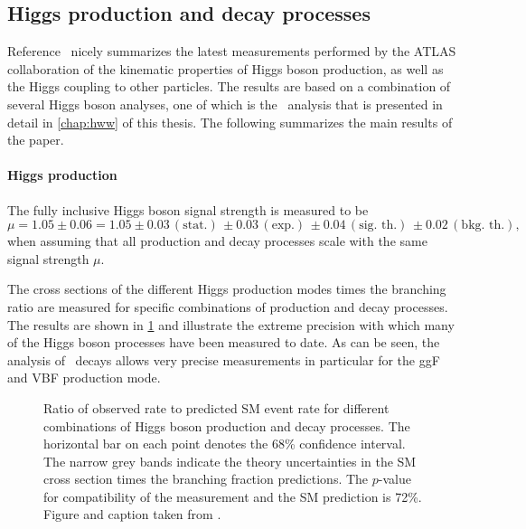 \subsection{Higgs production and decay processes}
Reference~\cite{NaturePaper} nicely summarizes the latest measurements performed by the ATLAS collaboration of the kinematic properties of Higgs boson production, as well as the Higgs coupling to other particles.
The results are based on a combination of several Higgs boson analyses, one of which is the \HWW\ analysis that is presented in detail in \cref{chap:hww} of this thesis. 
The following summarizes the main results of the paper.


\paragraph{Higgs production}
The fully inclusive Higgs boson signal strength is measured to be \cite{NaturePaper}
\begin{equation*}
   \mu =1.05 \pm 0.06 = 1.05\pm 0.03\, (\text{stat.})\, \pm 0.03\, (\text{exp.})\, \pm 0.04\, (\text{sig.\ th.})\, \pm 0.02\, (\text{bkg.\ th.}),
\end{equation*}
when assuming that all production and decay processes scale with the same signal strength $\mu$.

The cross sections of the different Higgs production modes times the branching ratio are measured for specific combinations of production and decay processes. The results are shown in \cref{fig:prod-per-channel} and illustrate the extreme precision with which many of the Higgs boson processes have been measured to date. As can be seen, the analysis of \HWW\ decays allows very precise measurements in particular for the ggF and VBF production mode.

\begin{figure}
  \caption{Ratio of observed rate to predicted SM event rate for different combinations of
  Higgs boson production and decay processes. The horizontal bar on each point denotes the 68\% confidence interval. The narrow grey bands indicate the theory uncertainties in the SM cross section times the branching
fraction predictions. The $p$-value for compatibility of the measurement and the SM prediction is
72\%. Figure and caption taken from .}
  \label{fig:prod-per-channel}
\end{figure}


